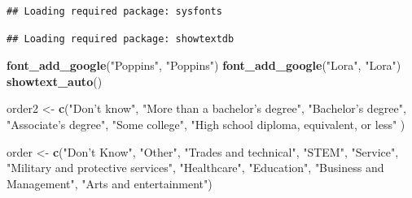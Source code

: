 \documentclass[11pt,]{article}
\newenvironment{Shaded}{\begin{snugshade}}{\end{snugshade}}
\newcommand{\KeywordTok}[1]{\textcolor[rgb]{0.13,0.29,0.53}{\textbf{#1}}}
\newcommand{\NormalTok}[1]{#1}
\newcommand{\StringTok}[1]{\textcolor[rgb]{0.31,0.60,0.02}{#1}}
\begin{document}
\begin{verbatim}
## Loading required package: sysfonts
\end{verbatim}

\begin{verbatim}
## Loading required package: showtextdb
\end{verbatim}

\begin{Shaded}
\begin{Highlighting}[]
\KeywordTok{font_add_google}\NormalTok{(}\StringTok{"Poppins"}\NormalTok{, }\StringTok{"Poppins"}\NormalTok{)}
\KeywordTok{font_add_google}\NormalTok{(}\StringTok{"Lora"}\NormalTok{, }\StringTok{"Lora"}\NormalTok{)}
\KeywordTok{showtext_auto}\NormalTok{()}
\end{Highlighting}
\end{Shaded}

\begin{Shaded}
\begin{Highlighting}[]
\NormalTok{order2 <-}\StringTok{ }\KeywordTok{c}\NormalTok{(}\StringTok{"Don't know"}\NormalTok{, }\StringTok{"More than a bachelor's degree"}\NormalTok{, }\StringTok{"Bachelor's degree"}\NormalTok{, }
           \StringTok{"Associate's degree"}\NormalTok{, }\StringTok{"Some college"}\NormalTok{, }
           \StringTok{"High school diploma, equivalent, or less"}
\NormalTok{           )}

\NormalTok{order <-}\StringTok{ }\KeywordTok{c}\NormalTok{(}\StringTok{"Don't Know"}\NormalTok{, }\StringTok{"Other"}\NormalTok{, }\StringTok{"Trades and technical"}\NormalTok{, }\StringTok{"STEM"}\NormalTok{, }\StringTok{"Service"}\NormalTok{,}
            \StringTok{"Military and protective services"}\NormalTok{, }\StringTok{"Healthcare"}\NormalTok{, }\StringTok{"Education"}\NormalTok{, }
            \StringTok{"Business and Management"}\NormalTok{, }\StringTok{"Arts and entertainment"}\NormalTok{)}
\end{Highlighting}
\end{Shaded}
\end{document}

